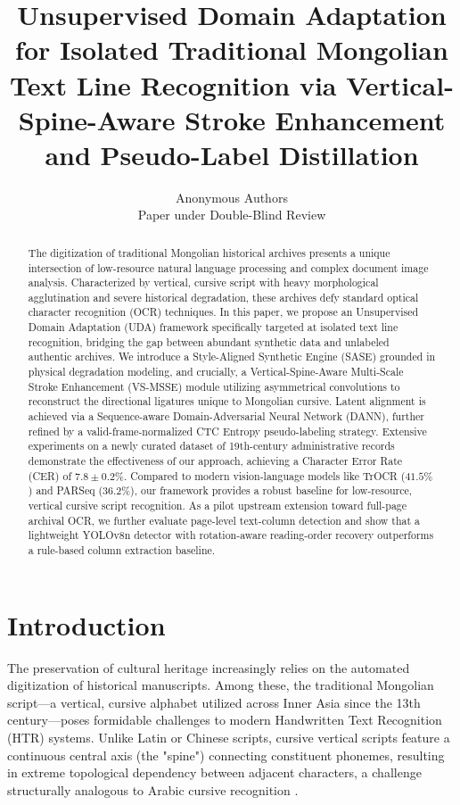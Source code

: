 \documentclass[11pt]{article}
\title{\LARGE \textbf{Unsupervised Domain Adaptation for Isolated Traditional Mongolian Text Line Recognition via Vertical-Spine-Aware Stroke Enhancement and Pseudo-Label Distillation}}
\author{
Anonymous Authors \\
\small Paper under Double-Blind Review
}
\date{}
\begin{document}
\maketitle

\begin{abstract}
The digitization of traditional Mongolian historical archives presents a unique intersection of low-resource natural language processing and complex document image analysis. Characterized by vertical, cursive script with heavy morphological agglutination and severe historical degradation, these archives defy standard optical character recognition (OCR) techniques. In this paper, we propose an Unsupervised Domain Adaptation (UDA) framework specifically targeted at isolated text line recognition, bridging the gap between abundant synthetic data and unlabeled authentic archives. We introduce a Style-Aligned Synthetic Engine (SASE) grounded in physical degradation modeling, and crucially, a Vertical-Spine-Aware Multi-Scale Stroke Enhancement (VS-MSSE) module utilizing asymmetrical convolutions to reconstruct the directional ligatures unique to Mongolian cursive. Latent alignment is achieved via a Sequence-aware Domain-Adversarial Neural Network (DANN), further refined by a valid-frame-normalized CTC Entropy pseudo-labeling strategy. Extensive experiments on a newly curated dataset of 19th-century administrative records demonstrate the effectiveness of our approach, achieving a Character Error Rate (CER) of $7.8 \pm 0.2\%$. Compared to modern vision-language models like TrOCR ($41.5\%$) and PARSeq ($36.2\%$), our framework provides a robust baseline for low-resource, vertical cursive script recognition. As a pilot upstream extension toward full-page archival OCR, we further evaluate page-level text-column detection and show that a lightweight YOLOv8n detector with rotation-aware reading-order recovery outperforms a rule-based column extraction baseline.
\end{abstract}

\section{Introduction}

The preservation of cultural heritage increasingly relies on the automated digitization of historical manuscripts. Among these, the traditional Mongolian script—a vertical, cursive alphabet utilized across Inner Asia since the 13th century—poses formidable challenges to modern Handwritten Text Recognition (HTR) systems. Unlike Latin or Chinese scripts, cursive vertical scripts feature a continuous central axis (the "spine") connecting constituent phonemes, resulting in extreme topological dependency between adjacent characters, a challenge structurally analogous to Arabic cursive recognition \cite{parvez2013arabic}. 
\end{document}
